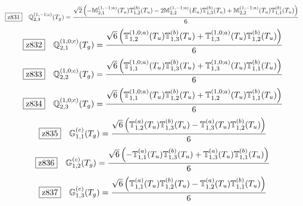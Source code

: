 \documentclass[fleqn,10pt,landscape]{jsarticle}
\begin{document}
\begin{dmath*}
\hspace*{3mm}\fbox{z831}\quad \mathbb{Q}_{2,3}^{(1,-1;c)}(T_{g})=\frac{\sqrt{2} \left(- \mathbb{M}_{2,1}^{(1,-1;a)}(T_{u}) \mathbb{T}_{1,2}^{(b)}(T_{u}) - 2 \mathbb{M}_{2,2}^{(1,-1;a)}(E_{u}) \mathbb{T}_{1,3}^{(b)}(T_{u}) + \mathbb{M}_{2,2}^{(1,-1;a)}(T_{u}) \mathbb{T}_{1,1}^{(b)}(T_{u})\right)}{6}
\end{dmath*}
\begin{dmath*}
\hspace*{3mm}\fbox{z832}\quad \mathbb{Q}_{2,1}^{(1,0;c)}(T_{g})=\frac{\sqrt{6} \left(\mathbb{T}_{1,2}^{(1,0;a)}(T_{u}) \mathbb{T}_{1,3}^{(b)}(T_{u}) + \mathbb{T}_{1,3}^{(1,0;a)}(T_{u}) \mathbb{T}_{1,2}^{(b)}(T_{u})\right)}{6}
\end{dmath*}
\begin{dmath*}
\hspace*{3mm}\fbox{z833}\quad \mathbb{Q}_{2,2}^{(1,0;c)}(T_{g})=\frac{\sqrt{6} \left(\mathbb{T}_{1,1}^{(1,0;a)}(T_{u}) \mathbb{T}_{1,3}^{(b)}(T_{u}) + \mathbb{T}_{1,3}^{(1,0;a)}(T_{u}) \mathbb{T}_{1,1}^{(b)}(T_{u})\right)}{6}
\end{dmath*}
\begin{dmath*}
\hspace*{3mm}\fbox{z834}\quad \mathbb{Q}_{2,3}^{(1,0;c)}(T_{g})=\frac{\sqrt{6} \left(\mathbb{T}_{1,1}^{(1,0;a)}(T_{u}) \mathbb{T}_{1,2}^{(b)}(T_{u}) + \mathbb{T}_{1,2}^{(1,0;a)}(T_{u}) \mathbb{T}_{1,1}^{(b)}(T_{u})\right)}{6}
\end{dmath*}
\begin{dmath*}
\hspace*{3mm}\fbox{z835}\quad \mathbb{G}_{1,1}^{(c)}(T_{g})=\frac{\sqrt{6} \left(\mathbb{T}_{1,2}^{(a)}(T_{u}) \mathbb{T}_{1,3}^{(b)}(T_{u}) - \mathbb{T}_{1,3}^{(a)}(T_{u}) \mathbb{T}_{1,2}^{(b)}(T_{u})\right)}{6}
\end{dmath*}
\begin{dmath*}
\hspace*{3mm}\fbox{z836}\quad \mathbb{G}_{1,2}^{(c)}(T_{g})=\frac{\sqrt{6} \left(- \mathbb{T}_{1,1}^{(a)}(T_{u}) \mathbb{T}_{1,3}^{(b)}(T_{u}) + \mathbb{T}_{1,3}^{(a)}(T_{u}) \mathbb{T}_{1,1}^{(b)}(T_{u})\right)}{6}
\end{dmath*}
\begin{dmath*}
\hspace*{3mm}\fbox{z837}\quad \mathbb{G}_{1,3}^{(c)}(T_{g})=\frac{\sqrt{6} \left(\mathbb{T}_{1,1}^{(a)}(T_{u}) \mathbb{T}_{1,2}^{(b)}(T_{u}) - \mathbb{T}_{1,2}^{(a)}(T_{u}) \mathbb{T}_{1,1}^{(b)}(T_{u})\right)}{6}
\end{dmath*}
\end{document}
